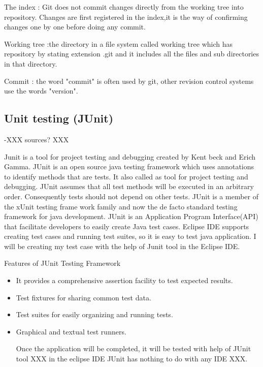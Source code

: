 \documentclass{article}
\begin{document}
The index : Git does not commit changes directly from the working tree into repository. Changes are first registered in the index,it is the way of confirming changes one by one before doing any commit.																										

Working tree :the directory in a file system called working tree which has repository by stating extension .git and it includes all the files and sub directories in that  directory.

Commit : the word "commit" is often used by git, other revision control systems use the words "version".


\subsection{Unit testing (JUnit)}
\label{sec:junit}

-XXX sources? XXX

Junit is a tool for project testing and debugging created by Kent beck and Erich Gamma.
JUnit is an open source java testing framework which uses annotations to identify methods that are tests. It also called as tool for project testing and debugging. JUnit assumes that all test methods will be executed in an arbitrary order. Consequently tests should not depend on other tests.
JUnit is a member of the xUnit testing frame work family and now the de facto standard testing framework for java development. JUnit is an Application Program Interface(API) that facilitate developers to easily create Java test cases.
Eclipse IDE supports creating test cases and running test suites, so it is easy to test java application.
I will be creating my test case with the help of Junit tool in the Eclipse IDE.

Features of JUnit Testing Framework
\begin{itemize}

\item It provides a comprehensive assertion facility to test expected results.
\item Test fixtures for sharing common test data.
\item Test suites for easily organizing and running tests.
\item Graphical and textual test runners.

Once the application will be completed, it will be tested with help of JUnit tool XXX in the eclipse IDE  JUnit has nothing to do with any IDE XXX.


\end{itemize}
\end{document}

